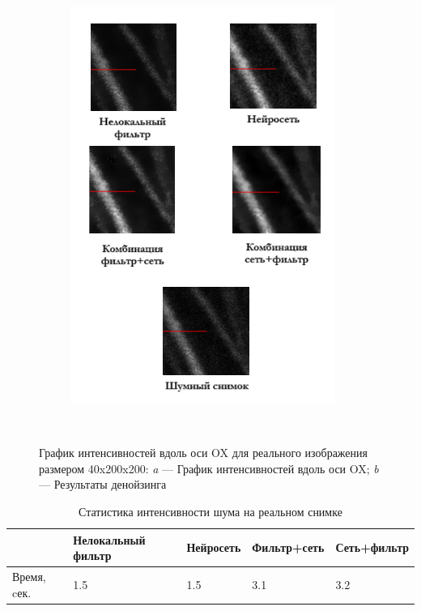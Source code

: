 \begin{figure}[H]
\begin{subfigure}[t]{0.3\textwidth\relax}
		\includegraphics[width=.95\linewidth,valign=t]{my_folder/images/denoising/intensity_test1_images.png}
	\end{subfigure}
	\\[20pt]
	\captionsetup{justification=centering} %
	\caption{График интенсивностей вдоль оси OX для реального изображения размером 40x200x200: {\itshape a} --- График интенсивностей вдоль оси OX; {\itshape b} --- Результаты денойзинга} 
	\label{fig:intensity-test1}
\end{figure}
\begin{table} [H]%
	\centering\small
	\caption{Статистика интенсивности шума на реальном снимке}%
	\label{tab:intensity-test1}		
	\begin{tabular}{|l|l|l|l|l|}
		\hline
		 &Нелокальный фильтр&Нейросеть&Фильтр+сеть&Сеть+фильтр\\
		\hline	
		Время, cек.
		&1.5&1.5&3.1&3.2\\ \hline
	\end{tabular}
	\normalsize%
\end{table}

